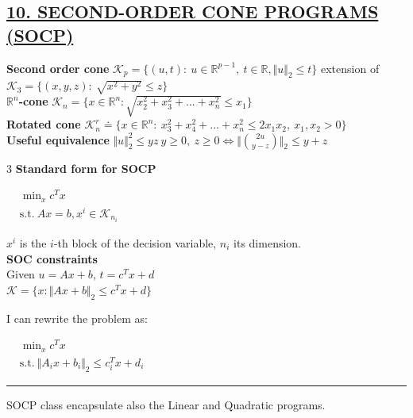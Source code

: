 \documentclass[a4paper]{article}
\begin{document}
\subsection*{\color{cyan}
\textsf{\underline{10. SECOND-ORDER CONE PROGRAMS (SOCP)}}}
\textbf{Second order cone} $\mathcal{K}_p=\{(u,t): \ u\in\mathbb{R}^{p-1}, \ t\in\mathbb{R}, \Vert u \Vert_2\le{t}\}$ extension of 
$\mathcal{K}_3=\{(x,y,z): \ \sqrt{x^2+y^2}\le{z}\}$\\
\textbf{$\mathbb{R}^n$-cone} $\mathcal{K}_n =\{x\in\mathbb{R}^n: \sqrt{x_2^2+x_3^2+...+x_n^2}\le{x_1}\}$\\
\textbf{Rotated cone} 
$\mathcal{K}_n^r\doteq\{x\in\mathbb{R}^n: \ x_3^2+x_4^2+...+x_n^2\le2x_1{x_2}, \ x_1, x_2 >0\}$\\
\textbf{Useful equivalence} $\Vert u \Vert_2^2 \le yz \ y\ge0, \ z\ge0 \iff \Vert \binom{2u}{y-z} \Vert_2 \le y+z$
\begin{multicols}{3}
    \noindent
    \textbf{Standard form for SOCP}
    \begin{center}
        $\begin{aligned}
            &\min_{x} c^T{x}\\
            &\text{s.t.} \ Ax=b, x^i \in \mathcal{K}_{n_i}
        \end{aligned}$
    \end{center}
    $x^i$ is the $i$-th block of the decision variable, $n_i$ its dimension.
    \newcolumn\\
    \textbf{SOC constraints}\\
    Given $u= Ax+b$, $t=c^T{x}+d$\\

    $\mathcal{K}=\{x: \Vert Ax+b \Vert_2 \le c^T{x}+d\}$
    \begin{center}
    \end{center}
    \newcolumn
    I can rewrite the problem as:
    \begin{center}
        $\begin{aligned}
            &\min_{x} {c^T{x}}\\
            &\text{s.t.} \ \Vert A_i{x}+b_i \Vert_2 \le c_i^T{x}+d_i
        \end{aligned}$
    \end{center}
    \hrule
    SOCP class encapsulate also the Linear and Quadratic programs.
\end{multicols}
\end{document}

